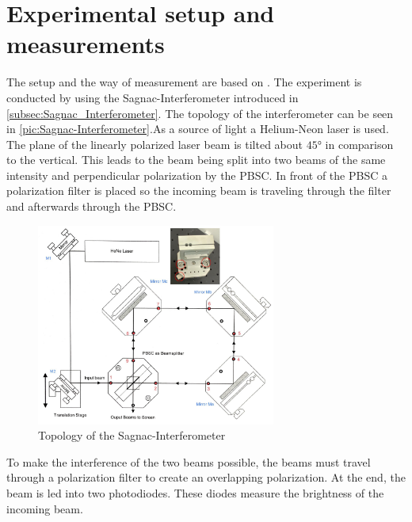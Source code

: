 \section{Experimental setup and measurements}
The setup and the way of measurement are based on \cite{anleitungV64}.
\label{sec:Experimentale}
The experiment is conducted by using the Sagnac-Interferometer introduced in \ref{subsec:Sagnac_Interferometer}. 
The topology of the interferometer can be seen in \autoref{pic:Sagnac-Interferometer}.As a 
source of light a Helium-Neon laser is used. The plane of the linearly polarized laser beam is tilted about $45°$ in comparison to 
the vertical. This leads to the beam being split into two beams of the same intensity and perpendicular polarization by the PBSC.
In front of the PBSC a polarization filter is placed so the incoming beam is traveling through the filter and afterwards through the 
PBSC. 

\begin{figure}
    \centering
    \includegraphics[width=0.70\textwidth]{content/Bilder/Sagnac_Interferometer.jpeg}
    \caption{Topology of the Sagnac-Interferometer \cite{anleitungV64}}
    \label{pic:Sagnac-Interferometer}
  \end{figure}

To make the interference of the two beams possible, the beams must travel through a polarization filter to create an overlapping polarization. 
At the end, the beam is led into two photodiodes. These diodes measure the brightness of the incoming beam. 

